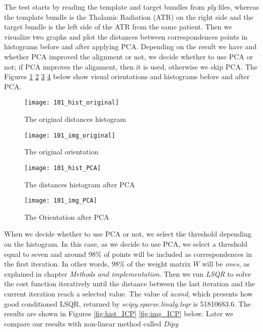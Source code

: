 \documentclass[../structure.tex]{subfiles}
\begin{document}
\hspace{2em}The test starts by reading the template and target bundles from \textit{ply} files, whereas the template bundle is the Thalamic Radiation (ATR) on the right side and the target bundle is the left side of the ATR from the same patient. Then we visualize two graphs and plot the distances between correspondences points in histograms before and after applying PCA. Depending on the result we have and whether PCA improved the alignment or not, we decide whether to use PCA or not; if PCA improves the alignment, then it is used, otherwise we skip PCA. The Figures \ref{fig:hist_original} \ref{fig:img_original} \ref{fig:hist_PCA} \ref{fig:img_PCA} below show visual orientations and histograms before and after PCA.

\begin{figure}[h!]
\centering
\texttt{[image: 101\_hist\_original]}
\captionsetup{justification=centering}
\caption{The original distances histogram}
\label{fig:hist_original}
\end{figure}

\begin{figure}[h!]
\centering
\texttt{[image: 101\_img\_original]}
\captionsetup{justification=centering}
\caption{The original orientation}
\label{fig:img_original}
\end{figure}
\pagebreak
\vspace{4em}
\begin{figure}[h!]
\centering
\texttt{[image: 101\_hist\_PCA]}
\captionsetup{justification=centering}
\caption{The distances histogram after PCA}
\label{fig:hist_PCA}
\end{figure}

\begin{figure}[h!]
\centering
\texttt{[image: 101\_img\_PCA]}
\captionsetup{justification=centering}
\caption{The Orientation after PCA}
\label{fig:img_PCA}
\end{figure}
\vspace{4em}
\pagebreak
When we decide whether to use PCA or not, we select the threshold depending on the histogram. In this case, as we decide to use PCA, we select a threshold equal to seven and around 98\% of points will be included as correspondences in the first iteration. In other words, 98\% of the weight matrix $W$ will be \textit{ones}, as explained in chapter \textit{Methods and implementation}. Then we run \textit{LSQR} to solve the cost function iteratively until the distance between the last iteration and the current iteration reach a selected value. The value of \textit{acond}, which presents how good conditioned LSQR, returned by \textit{scipy.sparse.linalg.lsqr} is 51810683.6. The results are shown in Figures \ref{fig:hist_ICP} \ref{fig:img_ICP} below. Later we compare our results with non-linear method called \textit{Dipy} 
\end{document}
